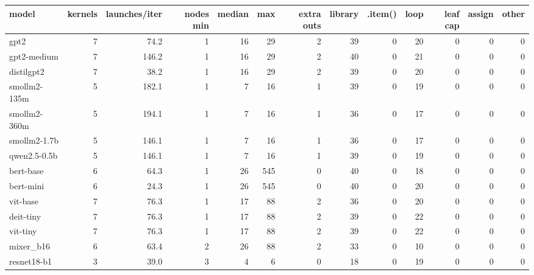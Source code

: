 \begin{tabular}{lrrrrrrrrrrrr}
\toprule
model & kernels & launches/iter & nodes min & median & max & extra outs & library & .item() & loop & leaf cap & assign & other \\
\midrule
gpt2 & 7 & 74.2 & 1 & 16 & 29 & 2 & 39 & 0 & 20 & 0 & 0 & 0 \\
gpt2-medium & 7 & 146.2 & 1 & 16 & 29 & 2 & 40 & 0 & 21 & 0 & 0 & 0 \\
distilgpt2 & 7 & 38.2 & 1 & 16 & 29 & 2 & 39 & 0 & 20 & 0 & 0 & 0 \\
smollm2-135m & 5 & 182.1 & 1 & 7 & 16 & 1 & 39 & 0 & 19 & 0 & 0 & 0 \\
smollm2-360m & 5 & 194.1 & 1 & 7 & 16 & 1 & 36 & 0 & 17 & 0 & 0 & 0 \\
smollm2-1.7b & 5 & 146.1 & 1 & 7 & 16 & 1 & 36 & 0 & 17 & 0 & 0 & 0 \\
qwen2.5-0.5b & 5 & 146.1 & 1 & 7 & 16 & 1 & 39 & 0 & 19 & 0 & 0 & 0 \\
bert-base & 6 & 64.3 & 1 & 26 & 545 & 0 & 40 & 0 & 18 & 0 & 0 & 0 \\
bert-mini & 6 & 24.3 & 1 & 26 & 545 & 0 & 40 & 0 & 20 & 0 & 0 & 0 \\
vit-base & 7 & 76.3 & 1 & 17 & 88 & 2 & 36 & 0 & 20 & 0 & 0 & 0 \\
deit-tiny & 7 & 76.3 & 1 & 17 & 88 & 2 & 39 & 0 & 22 & 0 & 0 & 0 \\
vit-tiny & 7 & 76.3 & 1 & 17 & 88 & 2 & 39 & 0 & 22 & 0 & 0 & 0 \\
mixer\_b16 & 6 & 63.4 & 2 & 26 & 88 & 2 & 33 & 0 & 10 & 0 & 0 & 0 \\
resnet18-b1 & 3 & 39.0 & 3 & 4 & 6 & 0 & 18 & 0 & 19 & 0 & 0 & 0 \\
\bottomrule
\end{tabular}
